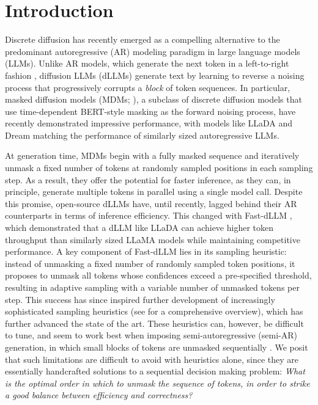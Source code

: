 \section{Introduction}

Discrete diffusion \citep{austin2021structured, hoogeboom2021argmax,DBLP:journals/corr/abs-2211-15089,DBLP:conf/icml/LouME24,DBLP:conf/nips/ShiHWDT24} has recently emerged as a compelling alternative to the predominant autoregressive (AR) modeling paradigm in large language models (LLMs). Unlike AR models, which generate the next token in a left-to-right fashion \citep{radford2018improving}, diffusion LLMs (dLLMs) generate text by learning to reverse a noising process that progressively corrupts a \textit{block} of token sequences. In particular, masked diffusion models (MDMs; \citealt{sahoo2024simple, ou2024your}), a subclass of discrete diffusion models that use time-dependent BERT-style \citep{devlin2019bert} masking as the forward noising process, have recently demonstrated impressive performance, with models like LLaDA \citep{llada2025} and Dream \citep{ye2025dream} matching the performance of similarly sized autoregressive LLMs. %


At generation time, MDMs begin with a fully masked sequence and iteratively unmask a fixed number of tokens at randomly sampled positions in each sampling step. As a result, they offer the potential for faster inference, as they can, in principle, generate multiple tokens in parallel using a single model call. %
Despite this promise, open-source dLLMs have, until recently, lagged behind their AR counterparts in terms of inference efficiency.
This changed with Fast-dLLM \citep{fastdllm2025}, which demonstrated that a dLLM like LLaDA \citep{llada2025} can achieve higher token throughput than similarly sized LLaMA models \citep{dubey2024llama} while maintaining competitive performance. A key component of Fast-dLLM lies in its sampling heuristic: instead of unmasking a fixed number of randomly sampled token positions, it proposes to unmask all tokens whose confidences exceed a pre-specified threshold, resulting in adaptive sampling with a variable number of unmasked tokens per step.
This success has since inspired further development of increasingly sophisticated sampling heuristics (see  for a comprehensive overview), which has further advanced the state of the art.
These heuristics can, however, be difficult to tune, and seem to work best when imposing semi-autoregressive (semi-AR) generation, in which small blocks of tokens are unmasked sequentially \citep{arriola2025block,llada2025}.
We posit that such limitations are difficult to avoid with heuristics alone, since they are essentially handcrafted solutions to a sequential decision making problem: 
\emph{What is the optimal order in which to unmask the sequence of tokens, in order to strike a good balance between efficiency and correctness?}


